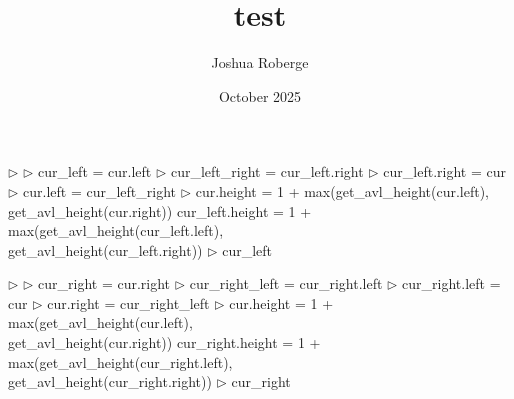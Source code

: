 \documentclass{article}
\title{test}
\author{Joshua Roberge}
\date{October 2025}
\begin{document}
\begin{algorithm}
\caption{Right Rotate}
\begin{algorithmic}[1]
\State $\triangleright$ 
    \State $\triangleright$ 
    \State cur\_left = cur.left
    \State $\triangleright$ 
    \State cur\_left\_right = cur\_left.right
    \State
    \State $\triangleright$ 
    \State cur\_left.right = cur
    \State $\triangleright$ 
    \State cur.left = cur\_left\_right
    \State
    \State $\triangleright$ 
    \State cur.height = 1 
        + max(get\_avl\_height(cur.left),\\
        \hspace{7.5em} get\_avl\_height(cur.right))
    \State
    \State cur\_left.height = 1 
        + max(get\_avl\_height(cur\_left.left),\\
        \hspace{9em} get\_avl\_height(cur\_left.right))
    \State
    \State $\triangleright$ 
    \State \Return cur\_left
\EndFunction
\end{algorithmic}
\end{algorithm}


\begin{algorithm}
\caption{Left Rotate}
\begin{algorithmic}[1]
\State $\triangleright$ 
    \State $\triangleright$ 
    \State cur\_right = cur.right
    \State $\triangleright$ 
    \State cur\_right\_left = cur\_right.left
    \State
    \State $\triangleright$ 
    \State cur\_right.left = cur
    \State $\triangleright$ 
    \State cur.right = cur\_right\_left
    \State
    \State $\triangleright$ 
    \State cur.height = 1 
        + max(get\_avl\_height(cur.left),\\
        \hspace{7.5em} get\_avl\_height(cur.right))
    \State
    \State cur\_right.height = 1 
        + max(get\_avl\_height(cur\_right.left),\\
        \hspace{9em} get\_avl\_height(cur\_right.right))
    \State
    \State $\triangleright$ 
    \State \Return cur\_right
\EndFunction
\end{algorithmic}
\end{algorithm}
\end{document}
